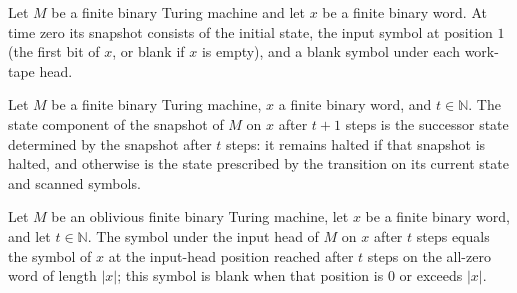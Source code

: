 \begin{theorem}
\label{Complexity.snapshotAt_zero}
\leanok
{}
Let $M$ be a finite binary Turing machine and let $x$ be a finite binary word. At time
zero its snapshot consists of the initial state, the input symbol at position $1$ (the
first bit of $x$, or blank if $x$ is empty), and a blank symbol under each work-tape
head.
\end{theorem}

\begin{theorem}
\label{Complexity.snapshotAt_state_succ}
\leanok
{}
Let $M$ be a finite binary Turing machine, $x$ a finite binary word, and
$t\in\mathbb{N}$. The state component of the snapshot of $M$ on $x$ after $t+1$ steps is
the successor state determined by the snapshot after $t$ steps: it remains halted if
that snapshot is halted, and otherwise is the state prescribed by the transition on its
current state and scanned symbols.
\end{theorem}

\begin{theorem}
\label{Complexity.snapshotAt_inputSymbol}
\leanok
{}
Let $M$ be an oblivious finite binary Turing machine, let $x$ be a finite binary word,
and let $t\in\mathbb{N}$. The symbol under the input head of $M$ on $x$ after $t$ steps
equals the symbol of $x$ at the input-head position reached after $t$ steps on the
all-zero word of length $|x|$; this symbol is blank when that position is $0$ or exceeds
$|x|$.
\end{theorem}

